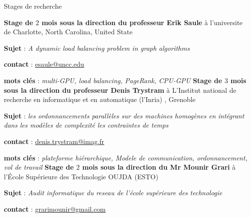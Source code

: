 \begin{rubric}{Stages de recherche}

	\textbf{Stage de $2$ mois sous la direction du professeur Erik Saule} à l’universite de Charlotte, North Carolina, United State
	\par \textbf{Sujet} : \emph{A dynamic load balancing problem in graph algorithms}
	\par \textbf{contact} : \href{mailto:esaule@uncc.edu}{esaule@uncc.edu}
	\par \textbf{mots clés} : \emph{multi-GPU, load balancing, PageRank, CPU-GPU}
%
%
	\textbf{Stage de $3$ mois sous la direction du professeur Denis Trystram} à L'Institut national de recherche en informatique et en automatique (l'Inria) , Grenoble
	\par	\textbf{Sujet} : \emph{les ordonnancements parallèles sur des machines homogènes en intégrant dans les modèles de complexité les contraintes de temps}
	\par \textbf{contact} :  \href{mailto:denis.trystram@imag.fr}{denis.trystram@imag.fr}
	\par \textbf{mots clés} : \emph{plateforme hiérarchique, Modele de communication, ordonnancement, vol de travail}
%
%
	\textbf{Stage de $2$ mois sous la direction du Mr Mounir Grari} à l’École Supérieure des Technologie OUJDA (ESTO)
	\par	\textbf{Sujet} : \emph{Audit informatique du reseau de l'école supérieure des technologie}
	\par \textbf{contact} :  \href{mailto:grarimounir@gmail.com}{grarimounir@gmail.com}
\end{rubric}
